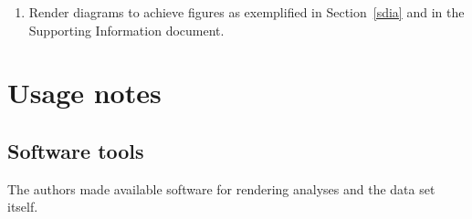 \documentclass[journal,article,submit,moreauthors,pdftex]{Definitions/mdpi}
\newcommand{\textttt}[1] {\texttt{\footnotesize#1}}
\begin{document}
\begin{enumerate}[leftmargin=0cm]
      \item Render diagrams to achieve figures as exemplified in Section~\ref{sdia} and in the Supporting Information document.
\end{enumerate}



\section{Usage notes}
\vspace{6pt} 
\subsection{Software tools}
The authors made available software for rendering analyses and
the data set itself.
\end{document}
